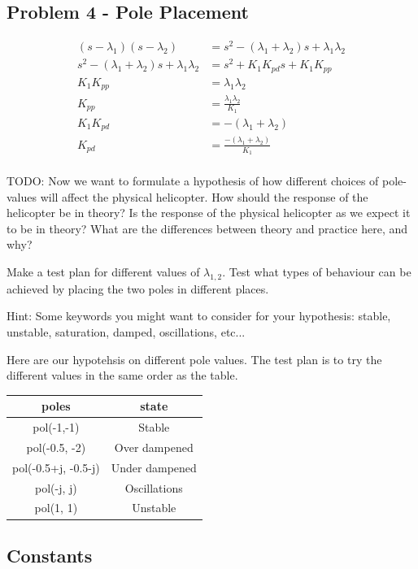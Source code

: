 \subsection{Problem 4 - Pole Placement}

\begin{align*}
    (s - \lambda_1) (s - \lambda_2) &= s^2 - (\lambda_1 + \lambda_2) s + \lambda_1 \lambda_2\\
    s^2 - (\lambda_1 + \lambda_2) s + \lambda_1 \lambda_2 &= s^2 + K_1 K_{pd} s + K_1 K_{pp}\\
    K_1 K_{pp} &= \lambda_1 \lambda_2\\
    K_{pp} &= \frac{\lambda_1 \lambda_2}{K_1}\\
    K_1 K_{pd} &= -(\lambda_1 + \lambda_2)\\
    K_{pd} &= \frac{-(\lambda_1 + \lambda_2)}{K_1}\\
\end{align*}

TODO: Now we want to formulate a hypothesis of how different choices of pole-values will affect the
physical helicopter. 
How should the response of the helicopter be in theory? 
Is the response of the physical helicopter as we expect it to be in theory? 
What are the differences between theory and practice here, and why?

Make a test plan for different values of $\lambda_{1,2}$. Test what types of behaviour can be achieved by placing the two poles in different places.

Hint: Some keywords you might want to consider for your hypothesis: stable, unstable, saturation, damped, oscillations, etc...

Here are our hypotehsis on different pole values. The test plan is to try the different values in the same order as the table.

\begin{tabular}{ c|c } 
    poles & state \\ \hline
    pol(-1,-1) & Stable \\
    pol(-0.5, -2) & Over dampened \\
    pol(-0.5+j, -0.5-j) & Under dampened \\
    pol(-j, j) & Oscillations \\
    pol(1, 1) & Unstable \\
\end{tabular}



\subsection{Constants}

